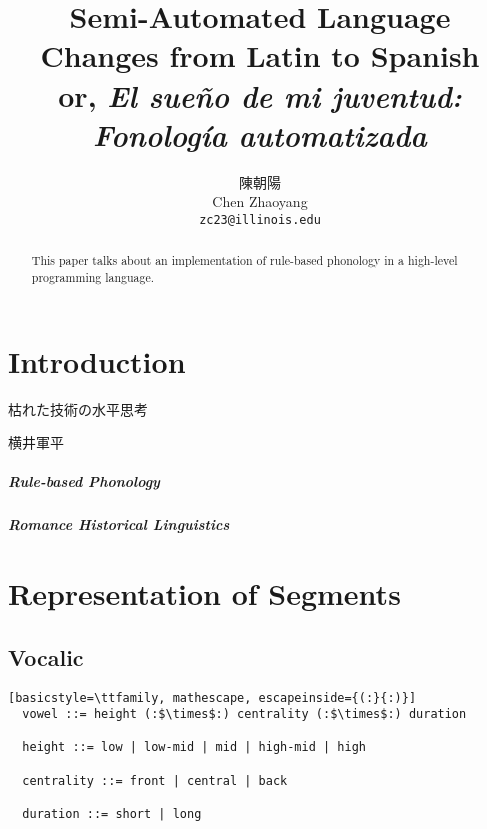 \documentclass{report}
\title{Semi-Automated Language Changes from Latin to Spanish \\ or, \emph{El sueño de mi juventud: Fonología automatizada}}
\author{陳朝陽 \\ Chen Zhaoyang \\ \texttt{zc23@illinois.edu}}
\begin{document}
\maketitle

\pagebreak

\begin{abstract}
  
  This paper talks about an implementation of rule-based phonology in a high-level programming language.

\end{abstract}

\pagebreak

\tableofcontents

\pagebreak

\chapter*{Introduction}

\epigraph{枯れた技術の水平思考\footnotemark}{横井軍平}

\paragraph{Rule-based Phonology}

\paragraph{Romance Historical Linguistics}

\chapter{Representation of Segments}

\section{Vocalic}

\begin{lstlisting}[basicstyle=\ttfamily, mathescape, escapeinside={(:}{:)}]
  vowel ::= height (:$\times$:) centrality (:$\times$:) duration

  height ::= low | low-mid | mid | high-mid | high

  centrality ::= front | central | back

  duration ::= short | long
\end{lstlisting}
\end{document}
